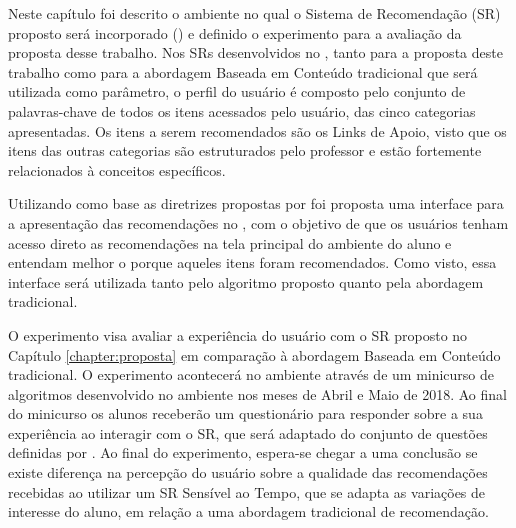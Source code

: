 Neste capítulo foi descrito o ambiente no qual o Sistema de Recomendação (SR) proposto será incorporado (\adaptweb) e definido o
experimento para a avaliação da proposta desse trabalho. Nos SRs desenvolvidos no \adaptweb, tanto para a proposta deste trabalho como para a abordagem
Baseada em Conteúdo tradicional que será utilizada como parâmetro, o perfil do usuário é composto pelo conjunto de palavras-chave de todos os itens acessados pelo usuário, das
cinco categorias apresentadas. Os itens a serem recomendados são os Links de Apoio, visto que os itens das outras categorias
são estruturados pelo professor e estão fortemente relacionados à conceitos específicos.

Utilizando como base as diretrizes propostas por  foi proposta uma interface para a apresentação das recomendações no \adaptweb,
com o objetivo de que os usuários tenham acesso direto as recomendações na tela principal do ambiente do aluno e entendam
melhor o porque aqueles itens foram recomendados. Como visto, essa interface será utilizada tanto pelo algoritmo proposto
quanto pela abordagem tradicional.

O experimento visa avaliar a experiência do usuário com o SR proposto no Capítulo \ref{chapter:proposta} em
comparação à abordagem Baseada em Conteúdo tradicional. O experimento acontecerá no ambiente
\adaptweb através de um minicurso de algoritmos desenvolvido no ambiente nos meses de
Abril e Maio de 2018. Ao final do minicurso os alunos receberão um questionário para responder sobre a sua experiência
ao interagir com o SR, que será adaptado do conjunto de questões definidas por . Ao final do
experimento, espera-se chegar a uma conclusão se existe diferença na percepção do usuário sobre a qualidade
das recomendações recebidas ao utilizar um SR Sensível ao Tempo, que se adapta as variações de interesse do
aluno, em relação a uma abordagem tradicional de recomendação.
